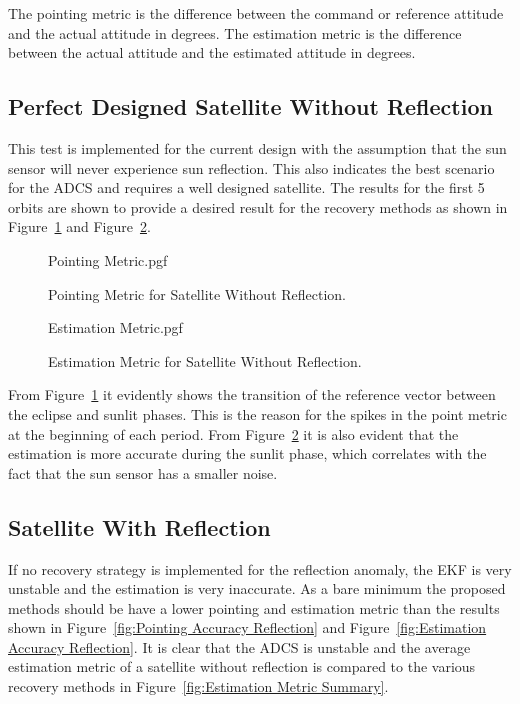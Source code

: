 \documentclass[letterpaper, 10 pt, conference]{ieeeconf}  %
\begin{document}
The pointing metric is the difference between the command or reference attitude and the actual attitude in degrees. The estimation metric is the difference between the actual attitude and the estimated attitude in degrees.

\subsection{Perfect Designed Satellite Without Reflection}
This test is implemented for the current design with the assumption that the sun sensor will never experience sun reflection. This also indicates the best scenario for the ADCS and requires a well designed satellite. The results for the first 5 orbits are shown to provide a desired result for the recovery methods as shown in Figure~\ref{fig:Pointing Accuracy None} and Figure~\ref{fig:Estimation Accuracy None}. 
\begin{figure}[!htb]
	\begin{center}
		{Pointing Metric.pgf}
	\end{center}
	\caption[Pointing Metric for Satellite Without Reflection]{Pointing Metric for Satellite Without Reflection.}
	\label{fig:Pointing Accuracy None}
\end{figure}

\begin{figure}[!htb]
	\begin{center}
	{Estimation Metric.pgf}
	\end{center}
	\caption[Estimation Metric for Satellite Without Reflection]{Estimation Metric for Satellite Without Reflection.}
	\label{fig:Estimation Accuracy None}
\end{figure}

From Figure~\ref{fig:Pointing Accuracy None} it evidently shows the transition of the reference vector between the eclipse and sunlit phases. This is the reason for the spikes in the point metric at the beginning of each period. From Figure~\ref{fig:Estimation Accuracy None} it is also evident that the estimation is more accurate during the sunlit phase, which correlates with the fact that the sun sensor has a smaller noise.

\subsection{Satellite With Reflection}
If no recovery strategy is implemented for the reflection anomaly, the EKF is very unstable and the estimation is very inaccurate. As a bare minimum the proposed methods should be have a lower pointing and estimation metric than the results shown in Figure~\ref{fig:Pointing Accuracy Reflection} and Figure~\ref{fig:Estimation Accuracy Reflection}. It is clear that the ADCS is unstable and the average estimation metric of a satellite without reflection is compared to the various recovery methods in Figure~\ref{fig:Estimation Metric Summary}.
\end{document}
